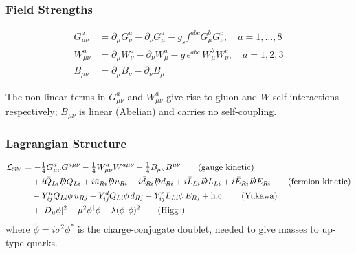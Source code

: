 
\subsubsection*{Field Strengths}

\begin{align}
  G^a_{\mu\nu} &= \partial_\mu G^a_\nu - \partial_\nu G^a_\mu
                  - g_s f^{abc} G^b_\mu G^c_\nu,
                  \quad a=1,\ldots,8
  \label{eq:lec19:gluon-fs}\\
  W^a_{\mu\nu} &= \partial_\mu W^a_\nu - \partial_\nu W^a_\mu
                  - g\,\epsilon^{abc}\,W^b_\mu W^c_\nu,
                  \quad a=1,2,3
  \label{eq:lec19:w-fs}\\
  B_{\mu\nu} &= \partial_\mu B_\nu - \partial_\nu B_\mu
  \label{eq:lec19:b-fs}
\end{align}

The non-linear terms in $G^a_{\mu\nu}$ and $W^a_{\mu\nu}$ give rise
to gluon and $W$ self-interactions respectively; $B_{\mu\nu}$ is
linear (Abelian) and carries no self-coupling.

\subsubsection*{Lagrangian Structure}

\begin{align}
  \mathcal{L}_{\rm SM}
  &= -\tfrac14 G^a_{\mu\nu}G^{a\mu\nu}
     -\tfrac14 W^a_{\mu\nu}W^{a\mu\nu}
     -\tfrac14 B_{\mu\nu}B^{\mu\nu}
  \tag{gauge kinetic}\\
  &\quad + i\bar Q_{Li}\slashed D Q_{Li}
          + i\bar u_{Ri}\slashed D u_{Ri}
          + i\bar d_{Ri}\slashed D d_{Ri}
          + i\bar L_{Li}\slashed D L_{Li}
          + i\bar E_{Ri}\slashed D E_{Ri}
  \tag{fermion kinetic}\\
  &\quad - Y^u_{ij}\bar Q_{Li}\tilde\phi\,u_{Rj}
          - Y^d_{ij}\bar Q_{Li}\phi\,d_{Rj}
          - Y^e_{ij}\bar L_{Li}\phi\,E_{Rj}
          + \mathrm{h.c.}
  \tag{Yukawa}\\
  &\quad + |D_\mu\phi|^2 - \mu^2\phi^\dagger\phi - \lambda(\phi^\dagger\phi)^2
  \tag{Higgs}
\end{align}
where $\tilde\phi = i\sigma^2\phi^*$ is the charge-conjugate doublet,
needed to give masses to up-type quarks.

